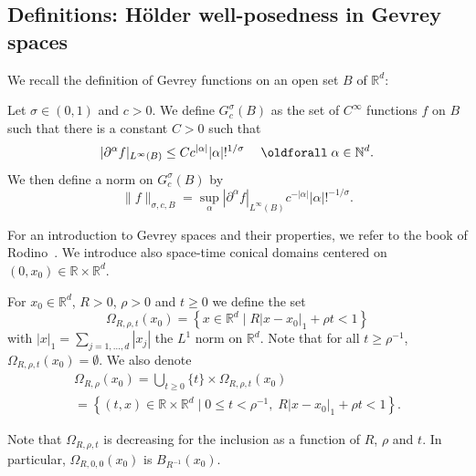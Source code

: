 \documentclass[AHL,Unicode,longabstracts,published]{cedram}
\theoremstyle{plain}
\newcommand*\R{{\mathbb R}}
\newcommand*\N{{\mathbb N}}
\newcommand{\dptl}{\partial}%
\newcommand{\alf}{\alpha}%
\renewcommand*{\forall}{\mathrel{\oldforall}}
\begin{document}
\subsection{Definitions: H\"older well-posedness in Gevrey spaces}\label{1.subsection.definitions}



We recall the definition of Gevrey functions on an open set $B$ of $\R^{d}$:

\begin{defi}\label{1.def.gevrey}
Let $\sigma\in(0,1)$ and $c>0$. We define $G^{\sigma}_{c}(B)$ as the set of $C^{\infty}$ functions $f$ on $B$ such that there is a constant $C>0$ such that
\begin{equation}
|\dptl^{\alf} f|_{L^{\infty}(B)} \leq C c^{|\alf|} |\alf|!^{1/\sigma} \quad \forall \alf \in\N^{d}.
\end{equation}
\noindent We then define a norm on $G^{\sigma}_{c}(B)$ by
\begin{equation}
\|f\|_{\sigma,c,B} = \sup_{\alf} |\dptl^{\alf} f|_{L^{\infty}(B)}c^{-|\alf|}|\alf|!^{-1/\sigma}.
\end{equation}
\end{defi}

For an introduction to Gevrey spaces and their properties, we refer to the book of Rodino~\cite{rodino1993linear}. We introduce also space-time conical domains centered on\linebreak $(0,x_0)\in\R\times\R^{d}$.

\begin{defi}\label{1.defi.conical}
For $x_0\in\R^{d}$, $R>0$, $\rho>0$ and $t\geq 0$ we define the set
\begin{equation}\label{1.defi.Omega.t}
\Omega_{R,\rho,t}(x_0) = \left\{x \in\R^{d} \;\Big|\; R |x-x_0|_{1} + \rho t <1 \right\}
\end{equation}
with $|x|_{1} = \sum_{j=1,\ldots,d} |x_j|$ the $L^{1}$ norm on $\R^{d}$. Note that for all $t \geq \rho^{-1}$, $\Omega_{R,\rho,t}(x_0) = \emptyset$. We also denote
\begin{multline}\label{1.defi.Omega}
\Omega_{R,\rho}(x_0)= \bigcup_{t\geq 0} \{t\}\times\Omega_{R,\rho,t}(x_0)\\
= \left\{(t,x) \in\R\times\R^{d} \;\Big|\; 0\leq t < \rho^{-1},\; R |x-x_0|_{1} + \rho t <1 \right\}.
\end{multline}
\end{defi}

Note that $\Omega_{R,\rho,t}$ is decreasing for the inclusion as a function of $R$, $\rho$ and $t$. In particular, $\Omega_{R,0,0}(x_0)$ is $B_{R^{-1}}(x_0)$.
\end{document}

